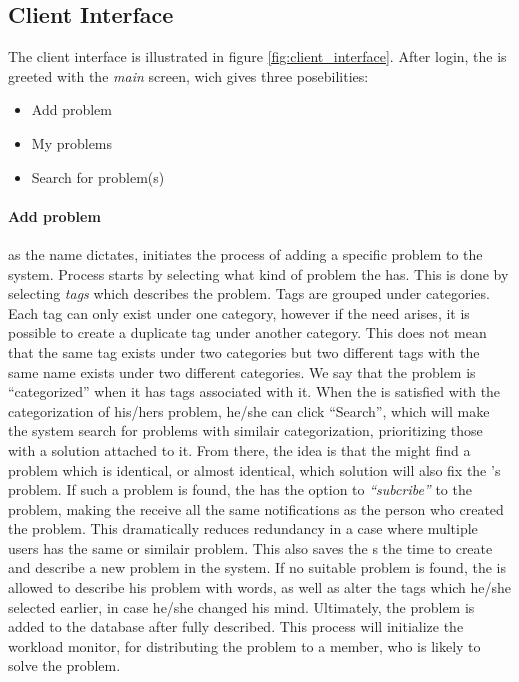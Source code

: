 \subsection{Client Interface}
\label{sec:client_interface}
The client interface is illustrated in figure \ref{fig:client_interface}.
After login, the \aclient[] is greeted with the \textit{main} screen, wich gives three posebilities:
\begin{itemize}
	\item Add problem
	\item My problems
	\item Search for problem(s)
\end{itemize}

\paragraph{Add problem}as the name dictates, initiates the process of adding a specific problem to the system. Process starts by selecting what kind of problem the \aclient[] has. This is done by selecting \textit{tags} which describes the problem. Tags are grouped under categories. Each tag can only exist under one category, however if the need arises, it is possible to create a duplicate tag under another category. This does not mean that the same tag exists under two categories but two different tags with the same name exists under two different categories. We say that the problem is ``categorized'' when it has tags associated with it.
When the \aclient[] is satisfied with the categorization of his/hers problem, he/she can click ``Search'', which will make the system search for problems with similair categorization, prioritizing those with a solution attached to it.
From there, the idea is that the \aclient[] might find a problem which is identical, or almost identical, which solution will also fix the \aclient 's problem. If such a problem is found, the \aclient[] has the option to \textit{``subcribe''} to the problem, making the \aclient[] receive all the same notifications as the person who created the problem. This dramatically reduces redundancy in a case where multiple users has the same or similair problem. This also saves the \aclient s the time to create and describe a new problem in the system.
If no suitable problem is found, the \aclient[] is allowed to describe his problem with words, as well as alter the tags which he/she selected earlier, in case he/she changed his mind. Ultimately, the problem is added to the database after fully described. This process will initialize the workload monitor, for distributing the problem to a \astaff[] member, who is likely to solve the problem.
